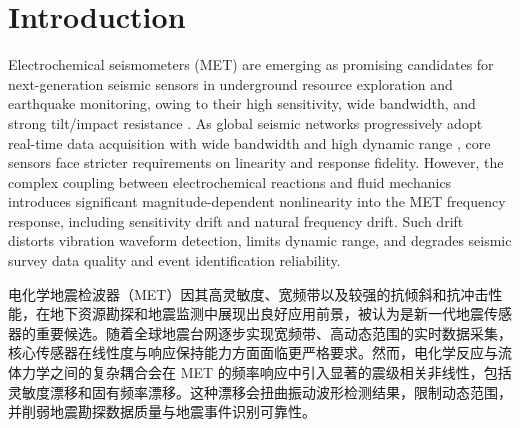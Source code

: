 \documentclass[sn-nature]{sn-jnl}
\newif\ifCNENEnglish
\newif\ifCNENBilingual
\newcommand{\CNEN}[2]{%
    \ifCNENBilingual
        #1%
        \if\relax\detokenize{#2}\relax\else\par #2\fi%
    \else
        \ifCNENEnglish
            #2%
        \else
            #1%
        \fi
    \fi
}
\begin{document}

\maketitle

\section{Introduction}

\CNEN{电化学地震检波器（MET）因其高灵敏度、宽频带以及较强的抗倾斜和抗冲击性能，在地下资源勘探和地震监测中展现出良好应用前景，被认为是新一代地震传感器的重要候选\cite{10841463}。随着全球地震台网逐步实现宽频带、高动态范围的实时数据采集\cite{WOS:000853457100001}，核心传感器在线性度与响应保持能力方面面临更严格要求。然而，电化学反应与流体力学之间的复杂耦合会在 MET 的频率响应中引入显著的震级相关非线性，包括灵敏度漂移和固有频率漂移。这种漂移会扭曲振动波形检测结果，限制动态范围，并削弱地震勘探数据质量与地震事件识别可靠性。}{Electrochemical seismometers (MET) are emerging as promising candidates for next-generation seismic sensors in underground resource exploration and earthquake monitoring, owing to their high sensitivity, wide bandwidth, and strong tilt/impact resistance \cite{10841463}. As global seismic networks progressively adopt real-time data acquisition with wide bandwidth and high dynamic range \cite{WOS:000853457100001}, core sensors face stricter requirements on linearity and response fidelity. However, the complex coupling between electrochemical reactions and fluid mechanics introduces significant magnitude-dependent nonlinearity into the MET frequency response, including sensitivity drift and natural frequency drift. Such drift distorts vibration waveform detection, limits dynamic range, and degrades seismic survey data quality and event identification reliability.%
}
\end{document}
